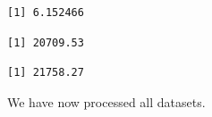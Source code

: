\begin{verbatim}
[1] 6.152466
\end{verbatim}

\begin{Shaded}
\begin{Highlighting}[]
\SpecialCharTok{\$}
\end{Highlighting}
\end{Shaded}

\begin{verbatim}
[1] 20709.53
\end{verbatim}

\begin{Shaded}
\begin{Highlighting}[]
\SpecialCharTok{\$}
\end{Highlighting}
\end{Shaded}

\begin{verbatim}
[1] 21758.27
\end{verbatim}

We have now processed all datasets.
